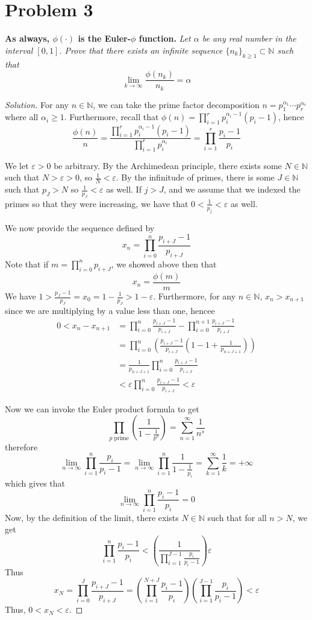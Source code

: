 \documentclass{article}
\newcommand{\N}{{\mathbb N}}
\newcommand{\ep}{{\varepsilon}}
\begin{document}
\section{Problem 3}
\textbf{As always, $\phi(\cdot)$ is the Euler-$\phi$ function.}\newline
{\it Let $\alpha$ be any real number in the interval $[0,1]$.
Prove that there exists an infinite sequence $\{n_k\}_{k \geq 1} \subset \N$ such that
\[
	\lim_{k\to\infty} \frac{\phi(n_k)}{n_k} = \alpha
\]
}
\begin{proof}[Solution]\let\qed\relax
For any $n \in \N$, we can take the prime factor decomposition
$n = p_1^{\alpha_1} \cdots p_r^{\alpha_r}$ where all $\alpha_i \geq 1$.
Furthermore, recall that $\phi(n) = \prod_{i=1}^r p_i^{\alpha_i-1}(p_i-1)$, hence
\[
	\frac{\phi(n)}{n} =
	\frac{\prod_{i=1}^r p_i^{\alpha_i-1}(p_i-1)}{\prod_{i=1}^r p_i^{\alpha_i}}
	= \prod_{i=1}^r \frac{p_i-1}{p_i}
\]

We let $\ep > 0$ be arbitrary.
By the Archimedean principle, there exists some $N \in \N$ such that
$N > \ep > 0$, so $\frac{1}{N} < \ep$.
By the infinitude of primes, there is some $J \in \N$ such that
$p_J > N$ so $\frac{1}{p_J} < \ep$ as well.
If $j > J$, and we assume that we indexed the primes so that they were increasing,
we have that $0 < \frac{1}{p_j} < \ep$ as well.

We now provide the sequence defined by
\[
	x_n = \prod_{i=0}^n \frac{p_{i+J}-1}{p_{i+J}}
\]
Note that if $m = \prod_{i=0}^n p_{i+J}$, we showed above then that
\[
	x_n = \frac{\phi(m)}{m}
\]
We have $1 > \frac{p_J-1}{p_J} = x_0 = 1 - \frac{1}{p_J} > 1- \ep$.
Furthermore, for any $n \in \N$, $x_n > x_{n+1}$ since
we are multiplying by a value less than one,
hencee
\begin{align*}
	0 < x_n - x_{n+1}
	&= \prod_{i=0}^n\frac{p_{i+J} - 1}{p_{i+J}} -
	\prod_{i=0}^{n+1}\frac{p_{i+J} - 1}{p_{i+J}} \\
	&= \prod_{i=0}^n\left(\frac{p_{i+J} - 1}{p_{i+J}}\left(1-1+\frac{1}{p_{n+J+1}}\right)\right)\\
	&= \frac{1}{p_{n+J+1}}\prod_{i=0}^n\frac{p_{i+J}-1}{p_{i+J}}\\
	&< \ep\prod_{i=0}^n\frac{p_{i+J}-1}{p_{i+J}} < \ep
\end{align*}

Now we can invoke the Euler product formula to get
\[
	\prod_{p\text{ prime}}\left(\frac{1}{1-\frac{1}{p^s}}\right)
	= \sum_{n=1}^\infty \frac{1}{n^s}
\]
therefore
\[
	\lim_{n\to\infty} \prod_{i=1}^n \frac{p_i}{p_i-1}
	= \lim_{n\to\infty} \prod_{i=1}^n \frac{1}{1-\frac{1}{p_i}}
	= \sum_{k=1}^\infty \frac{1}{k} = +\infty
\]
which gives that
\[
	\lim_{n\to\infty}\prod_{i=1}^n \frac{p_i-1}{p_i} = 0
\]
Now, by the definition of the limit, there exists $N \in \N$ such that for all $n > N$, we get
\[
	\prod_{i=1}^n \frac{p_i-1}{p_i} < \left(\frac{1}{\prod_{i=1}^{J-1}\frac{p_i}{p_i-1}}\right)\ep
\]
Thus
\[
	x_{N} = \prod_{i=0}^J\frac{p_{i+J}-1}{p_{i+J}}
	= \left(\prod_{i=1}^{N+J}\frac{p_i-1}{p_i}\right)
	\left(\prod_{i=1}^{J-1}\frac{p_i}{p_i-1}\right) < \ep
\]
Thus, $0 < x_N < \ep$.


\end{proof}
\end{document}
